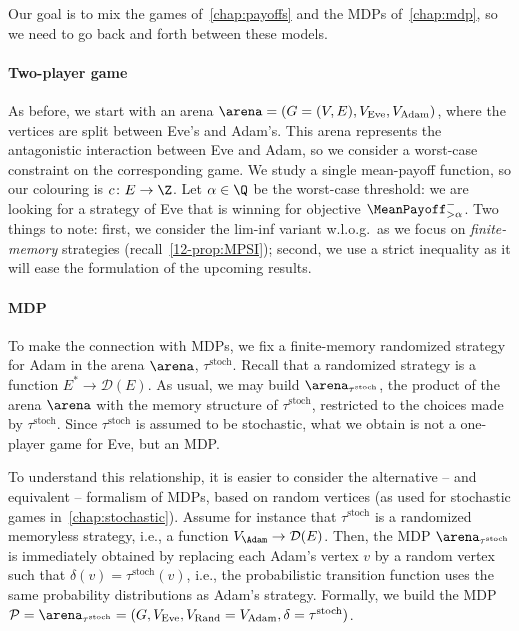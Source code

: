 Our goal is to mix the games of~\cref{chap:payoffs} and the MDPs of~\cref{chap:mdp}, so we need to go back and forth between these models.

\paragraph{Two-player game} As before, we start with an arena $\arena = (G = (V, E), V_{\text{Eve}}, V_{\text{Adam}})$, where the vertices are split between Eve's and Adam's. This arena represents the antagonistic interaction between Eve and Adam, so we consider a worst-case constraint on the corresponding game. We study a single mean-payoff function, so our colouring is $c\colon E \to \Z$. Let $\alpha \in \Q$ be the worst-case threshold: we are looking for a strategy of Eve that is winning for objective $\MeanPayoff^{-}_{> \alpha}$. Two things to note: first, we consider the lim-inf variant w.l.o.g.~as we focus on \textit{finite-memory} strategies (recall~\cref{12-prop:MPSI}); second, we use a strict inequality as it will ease the formulation of the upcoming results.

\paragraph{MDP} To make the connection with MDPs, we fix a finite-memory randomized strategy for Adam in the arena $\arena$, $\tau^\text{stoch}$. Recall that a randomized strategy  is a function $E^* \to \mathcal{D}(E)$. As usual, we may build $\arena_{\tau^\text{stoch}}$, the product of the arena $\arena$ with the memory structure of $\tau^\text{stoch}$, restricted to the choices made by $\tau^\text{stoch}$. Since $\tau^\text{stoch}$ is assumed to be stochastic, what we obtain is not a one-player game for Eve, but an MDP.

To understand this relationship, it is easier to consider the alternative -- and equivalent -- formalism of MDPs, based on random vertices (as used for stochastic games in~\cref{chap:stochastic}). Assume for instance that $\tau^\text{stoch}$ is a randomized memoryless strategy, i.e., a function $V_{\Adam} \to \mathcal{D}(E)$. Then, the MDP $\arena_{\tau^\text{stoch}}$ is immediately obtained by replacing each Adam's vertex $v$ by a random vertex such that $\delta(v) = \tau^\text{stoch}(v)$, i.e., the probabilistic transition function uses the same probability distributions as Adam's strategy. Formally, we build the MDP $\mathcal{P} = \arena_{\tau^{\text{stoch}}} = (G, V_{\text{Eve}}, V_{\text{Rand}} = V_{\text{Adam}}, \delta = \tau^{\text{stoch}})$.

